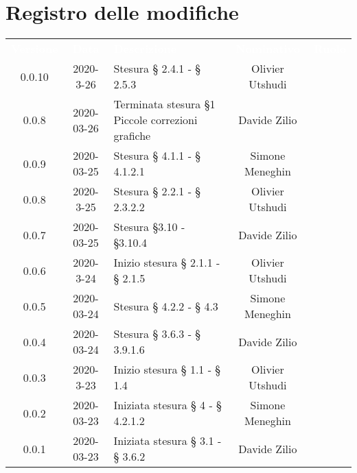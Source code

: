 
\section*{Registro delle modifiche}
{
	\centering
	\begin{longtable}{ c c  C{4cm}  c  c }
		\textcolor{white}{\textbf{Versione}} & \textcolor{white}{\textbf{Data}} & \textcolor{white}{\textbf{Descrizione}} & \textcolor{white}{\textbf{Nominativo}} & \textcolor{white}{\textbf{Ruolo}}\\
		
		0.0.10 & 2020-3-26 & Stesura § 2.4.1 - § 2.5.3 & Olivier Utshudi &\reda{}\\
		0.0.8 & 2020-03-26 & Terminata stesura \S 1 \newline Piccole correzioni grafiche & Davide Zilio &\reda{}\\
		0.0.9 & 2020-03-25 & Stesura § 4.1.1 - § 4.1.2.1 & Simone Meneghin &\reda{}\\	
		
		0.0.8 & 2020-3-25 & Stesura § 2.2.1 - § 2.3.2.2 & Olivier Utshudi &\reda{}\\
		
		0.0.7 & 2020-03-25 & Stesura \S 3.10 - \S 3.10.4 & Davide Zilio & \reda{}\\
		
		0.0.6 & 2020-3-24 & Inizio stesura § 2.1.1 - § 2.1.5 & Olivier Utshudi &\reda{}\\

		0.0.5 & 2020-03-24 & Stesura § 4.2.2 - § 4.3 & Simone Meneghin &\reda{}\\		
		
		0.0.4 & 2020-03-24 & Stesura § 3.6.3 - § 3.9.1.6 & Davide Zilio &\reda{}\\
		
		0.0.3 & 2020-3-23 & Inizio stesura § 1.1 - § 1.4 & Olivier Utshudi &\reda{}\\
		
		0.0.2 & 2020-03-23 & Iniziata stesura § 4 - § 4.2.1.2 & Simone Meneghin &\reda{}\\
		
		0.0.1 & 2020-03-23 & Iniziata stesura § 3.1 - § 3.6.2 & Davide Zilio &\reda{}\\		
		
	\end{longtable}

}